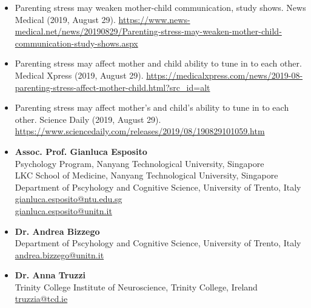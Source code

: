 \documentclass[10pt,a4paper]{altacv}
\begin{document}
\begin{fullwidth}
\begin{itemize}
			\item Parenting stress may weaken mother-child communication, study shows. News Medical (2019, August 29). \url{https://www.news-medical.net/news/20190829/Parenting-stress-may-weaken-mother-child-communication-study-shows.aspx}
			\item Parenting stress may affect mother and child ability to tune in to each other. Medical Xpress (2019, August 29). \url{https://medicalxpress.com/news/2019-08-parenting-stress-affect-mother-child.html?src_id=alt}
			\item Parenting stress may affect mother's and child's ability to tune in to each other. Science Daily (2019, August 29). \url{https://www.sciencedaily.com/releases/2019/08/190829101059.htm}	
			
		\end{itemize}
		
		
		
		
		

		
		\newpage
		
		
		\begin{itemize}
			\item \textbf{Assoc. Prof. Gianluca Esposito}\\
			Psychology Program, Nanyang Technological University, Singapore\\
			LKC School of Medicine, Nanyang Technological University, Singapore\\
			Department of Pscyhology and Cognitive Science, University of Trento, Italy\\
			\href{mailto:gianluca.esposito@ntu.edu.sg}{gianluca.esposito@ntu.edu.sg}\\
			\href{mailto:gianluca.esposito@unitn.it}{gianluca.esposito@unitn.it}

			\item \textbf{Dr. Andrea Bizzego}\\
			Department of Pscyhology and Cognitive Science, University of Trento, Italy\\
			\href{mailto:andrea.bizzego@unitn.it}{andrea.bizzego@unitn.it}
			
			\item \textbf{Dr. Anna Truzzi}\\
			Trinity College Institute of Neuroscience, Trinity College, Ireland\\
			\href{mailto:truzzia@tcd.ie}{truzzia@tcd.ie}

		\end{itemize}
		
	\end{fullwidth}
	
\end{document}
